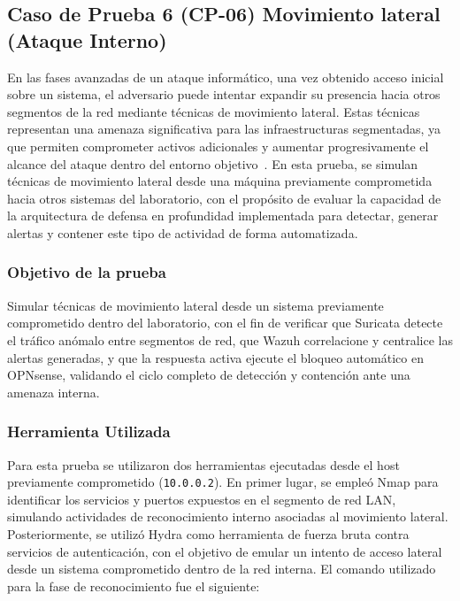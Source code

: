 \subsection{Caso de Prueba 6 (CP-06) Movimiento lateral (Ataque Interno)}
\noindent

En las fases avanzadas de un ataque informático, una vez obtenido acceso inicial sobre un sistema, el adversario puede intentar expandir 
su presencia hacia otros segmentos de la red mediante técnicas de movimiento lateral. Estas técnicas representan una amenaza 
significativa para las infraestructuras segmentadas, ya que permiten comprometer activos adicionales y aumentar progresivamente el 
alcance del ataque dentro del entorno objetivo~\cite{MITREATTACK2026}. En esta prueba, se simulan técnicas de movimiento lateral 
desde una máquina previamente comprometida hacia otros sistemas del laboratorio, con el propósito de evaluar la capacidad de la 
arquitectura de defensa en profundidad implementada para detectar, generar alertas y contener este tipo de actividad de forma 
automatizada.

\subsubsection{Objetivo de la prueba}
\noindent

Simular técnicas de movimiento lateral desde un sistema previamente comprometido dentro del laboratorio, con el fin de 
verificar que Suricata detecte el tráfico anómalo entre segmentos de red, que Wazuh correlacione y centralice las alertas 
generadas, y que la respuesta activa ejecute el bloqueo automático en OPNsense, validando el ciclo completo de detección y 
contención ante una amenaza interna.

\subsubsection{Herramienta Utilizada}
\noindent

Para esta prueba se utilizaron dos herramientas ejecutadas desde el host previamente comprometido (\texttt{10.0.0.2}). 
En primer lugar, se empleó Nmap para identificar los servicios y puertos expuestos en el segmento de red LAN, simulando 
actividades de reconocimiento interno asociadas al movimiento lateral. Posteriormente, se utilizó Hydra como herramienta 
de fuerza bruta contra servicios de autenticación, con el objetivo de emular un intento de acceso lateral desde un sistema 
comprometido dentro de la red interna. El comando utilizado para la fase de reconocimiento fue el siguiente:

